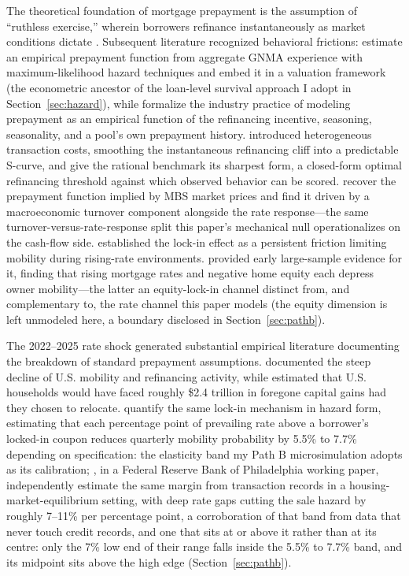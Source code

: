 \documentclass[12pt]{article}
\begin{document}
The theoretical foundation of mortgage prepayment is the assumption of ``ruthless exercise,'' wherein borrowers refinance instantaneously as market conditions dictate \citep{dunn1981}. Subsequent literature recognized behavioral frictions: \citet{schwartz1989} estimate an empirical prepayment function from aggregate GNMA experience with maximum-likelihood hazard techniques and embed it in a valuation framework (the econometric ancestor of the loan-level survival approach I adopt in Section~\ref{sec:hazard}), while \citet{richard1989} formalize the industry practice of modeling prepayment as an empirical function of the refinancing incentive, seasoning, seasonality, and a pool's own prepayment history. \citet{stanton1995} introduced heterogeneous transaction costs, smoothing the instantaneous refinancing cliff into a predictable S-curve, and \citet{agarwal2013} give the rational benchmark its sharpest form, a closed-form optimal refinancing threshold against which observed behavior can be scored. \citet{chernov2018} recover the prepayment function implied by MBS market prices and find it driven by a macroeconomic turnover component alongside the rate response---the same turnover-versus-rate-response split this paper's mechanical null operationalizes on the cash-flow side. \citet{quigley1987,quigley2002} established the lock-in effect as a persistent friction limiting mobility during rising-rate environments. \citet{ferreira2010} provided early large-sample evidence for it, finding that rising mortgage rates and negative home equity each depress owner mobility---the latter an equity-lock-in channel distinct from, and complementary to, the rate channel this paper models (the equity dimension is left unmodeled here, a boundary disclosed in Section~\ref{sec:pathb}).

The 2022--2025 rate shock generated substantial empirical literature documenting the breakdown of standard prepayment assumptions. \citet{fonseca2024} documented the steep decline of U.S. mobility and refinancing activity, while \citet{batzer2024} estimated that U.S. households would have faced roughly \$2.4 trillion in foregone capital gains had they chosen to relocate. \citet{liebersohn2024} quantify the same lock-in mechanism in hazard form, estimating that each percentage point of prevailing rate above a borrower's locked-in coupon reduces quarterly mobility probability by 5.5\% to 7.7\% depending on specification: the elasticity band my Path B microsimulation adopts as its calibration; \citet{graybill2026}, in a Federal Reserve Bank of Philadelphia working paper, independently estimate the same margin from transaction records in a housing-market-equilibrium setting, with deep rate gaps cutting the sale hazard by roughly 7--11\% per percentage point, a corroboration of that band from data that never touch credit records, and one that sits at or above it rather than at its centre: only the 7\% low end of their range falls inside the 5.5\% to 7.7\% band, and its midpoint sits above the high edge (Section~\ref{sec:pathb}).
\end{document}
